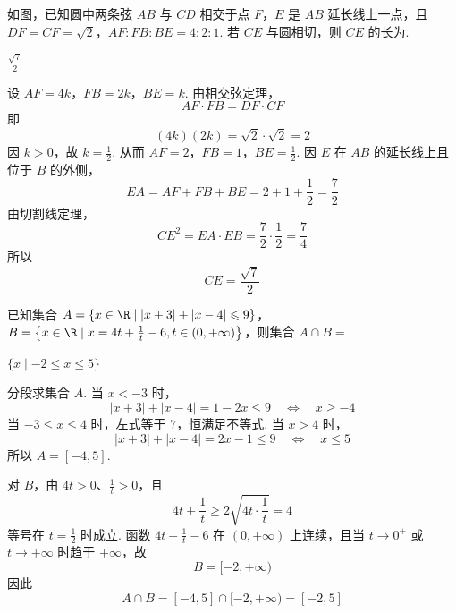 \begin{problem}
如图，已知圆中两条弦 \(AB\) 与 \(CD\) 相交于点 \(F\)，\(E\) 是 \(AB\) 延长线上一点，且 \(DF = CF = \sqrt{2}\)，\(AF:FB:BE = 4:2:1\).
若 \(CE\) 与圆相切，则 \(CE\) 的长为\fillinblank{}.

\begin{answer}
\(\frac{\sqrt{7}}{2}\)
\end{answer}

\begin{solution}
设
\(AF=4k\)，\(FB=2k\)，\(BE=k\).
由相交弦定理，
\[
AF\cdot FB=DF\cdot CF
\]
即
\[
(4k)(2k)=\sqrt2\cdot\sqrt2=2
\]
因 \(k>0\)，故 \(k=\frac12\). 从而
\(AF=2\)，\(FB=1\)，\(BE=\frac12\).
因 \(E\) 在 \(AB\) 的延长线上且位于 \(B\) 的外侧，
\[
EA=AF+FB+BE=2+1+\frac12=\frac72
\]
由切割线定理，
\[
CE^2=EA\cdot EB=\frac72\cdot\frac12=\frac74
\]
所以
\[
CE=\frac{\sqrt7}{2}
\]
\end{solution}
\end{problem}

\begin{problem}
已知集合 \(A = \{x \in \R \mid |x + 3| + |x - 4| \leqslant 9\}\)，\(B = \left\{x \in \R \mid x = 4t + \frac{1}{t} - 6, t \in (0, +\infty)\right\}\)，则集合 \(A \cap B = \)\fillinblank{}.
\begin{answer}
\(\{x \mid -2 \leqslant x \leqslant 5\}\)
\end{answer}

\begin{solution}
分段求集合 \(A\). 当 \(x<-3\) 时，
\[
|x+3|+|x-4|=1-2x\leqslant9
\quad\Longleftrightarrow\quad x\geqslant-4
\]
当 \(-3\leqslant x\leqslant4\) 时，左式等于 \(7\)，恒满足不等式. 当 \(x>4\) 时，
\[
|x+3|+|x-4|=2x-1\leqslant9
\quad\Longleftrightarrow\quad x\leqslant5
\]
所以 \(A=[-4,5]\).

对 \(B\)，由 \(4t>0\)、\(\frac{1}{t}>0\)，且
\[
4t+\frac1t\geqslant2\sqrt{4t\cdot\frac1t}=4
\]
等号在 \(t=\frac{1}{2}\) 时成立. 函数 \(4t+\frac{1}{t}-6\) 在 \((0,+\infty)\) 上连续，且当 \(t\to0^+\) 或 \(t\to+\infty\) 时趋于 \(+\infty\)，故
\[
B=[-2,+\infty)
\]
因此
\[
A\cap B=[-4,5]\cap[-2,+\infty)=[-2,5]
\]
\end{solution}

\end{problem}

